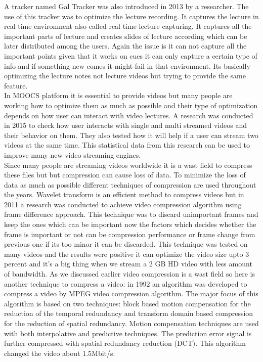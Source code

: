 A tracker named Gal Tracker was also introduced in 2013 by a researcher. The use of this tracker was to optimize the lecture recording. It captures the lecture in real time environment also called real time lecture capturing. It captures all the important parts of lecture and creates slides of lecture according which can be later distributed among the users.\cite{Gonzalez-Agulla2013} Again the issue is it can not capture all the important points given that it works on cues it can only capture a certain type of info and if something new comes it might fail in that environment. Its basically optimizing the lecture notes not lecture videos but trying to provide the same feature.\\
In MOOCS platform it is essential to provide videos but many people are working how to optimize them as much as possible and their type of optimization depends on how user can interact with video lectures. A research was conducted in 2015 to check how user interacts with single and multi streamed videos and their behavior on them. They also tested how it will help if a user can stream two videos at the same time.\cite{Renz2015} This statistical data from this research can be used to improve many new video streaming engines.\\
Since many people are streaming videos worldwide it is a wast field to compress these files but but compression can cause loss of data. To minimize the loss of data as much as possible different techniques of compression are used throughout the years. Wavelet transform is an efficient method to compress videos but in 2011 a research was conducted to achieve video compression algorithm using frame difference approach. This technique was to discard unimportant frames and keep the ones which can be important now the factors which decides whether the frame is important or not can be compression performance or frame change from previous one if its too minor it can be discarded. This technique was tested on many videos and the results were positive it can optimize the video size upto 3 percent and it's a big thing when we stream a 2 GB HD video with less amount of bandwidth.\cite{AlAni2011}
As we discussed earlier video compression is a wast field so here is another technique to compress a video: in 1992 an algorithm was developed to compress a video by MPEG video compression algorithm. The major focus of this algorithm is based on two techniques: block based motion compensation for the reduction of the temporal redundancy and transform domain based compression for the reduction of spatial redundancy. Motion compensation techniques are used with both interpolative and predictive techniques. The prediction error signal is further compressed with spatial redundancy reduction (DCT). This algorithm changed the video about 1.5Mbit/s.\cite{LeGall1992}\\
